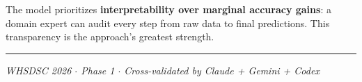 \documentclass[11pt, a4paper]{article}
\begin{document}
The model prioritizes \textbf{interpretability over marginal accuracy gains}: a domain expert can audit every step from raw data to final predictions. This transparency is the approach's greatest strength.

\vspace{0.5cm}
\hrule
\vspace{0.3cm}
\begin{center}
\small\textit{WHSDSC 2026 $\cdot$ Phase 1 $\cdot$ Cross-validated by Claude + Gemini + Codex}
\end{center}
\end{document}

